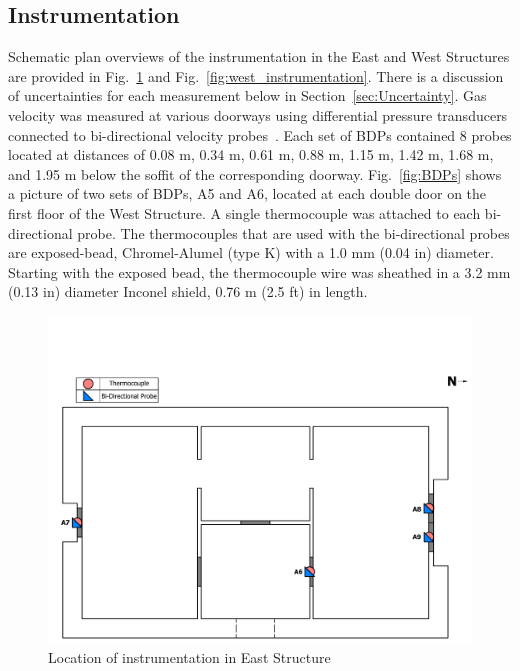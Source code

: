 \documentclass[12pt,oneside]{book}
\begin{document}
\subsection{Instrumentation}
\label{sec:Instrumentation}
Schematic plan overviews of the instrumentation in the East and West Structures are provided in Fig.~\ref{fig:east_instrumentation} and Fig.~\ref{fig:west_instrumentation}. There is a discussion of uncertainties for each measurement below in Section~\ref{sec:Uncertainty}. Gas velocity was measured at various doorways using differential pressure transducers connected to bi-directional velocity probes~\cite{McCaffrey:Combustion_and_Flame}. Each set of BDPs contained 8 probes located at distances of 0.08 m, 0.34 m, 0.61 m, 0.88 m, 1.15 m, 1.42 m, 1.68 m, and 1.95 m below the soffit of the corresponding doorway. Fig.~\ref{fig:BDPs} shows a picture of two sets of BDPs, A5 and A6, located at each double door on the first floor of the West Structure. A single thermocouple was attached to each bi-directional probe. The thermocouples that are used with the bi-directional probes are exposed-bead, Chromel-Alumel (type K) with a 1.0 mm (0.04 in) diameter. Starting with the exposed bead, the thermocouple wire was sheathed in a 3.2 mm (0.13 in) diameter Inconel shield, 0.76 m (2.5 ft) in length.

\begin{figure}[!ht]
\includegraphics[trim=0cm 0cm 0.25cm 3.75cm, clip=true, width=6in]{../Drawings/Instrumentation/East_Structure_Devices_Hose_Test}
\caption[Location of Instrumentation in East Structure]{Location of instrumentation in East Structure}
\label{fig:east_instrumentation}
\end{figure}
\end{document}
